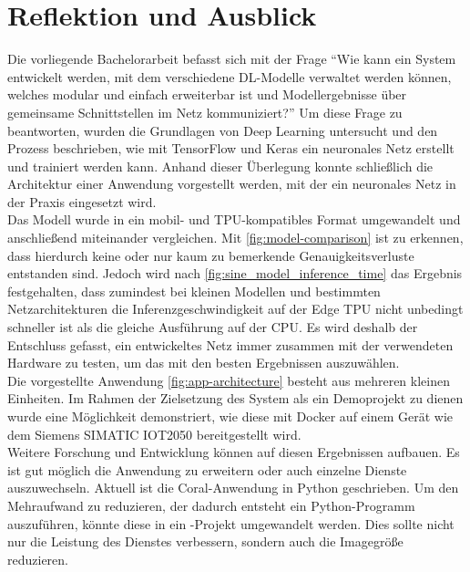 \chapter{Reflektion und Ausblick}
Die vorliegende Bachelorarbeit befasst sich mit der Frage
\enquote{Wie kann ein System entwickelt werden, mit dem verschiedene DL-Modelle
verwaltet werden können, welches modular und einfach erweiterbar ist
und Modellergebnisse über gemeinsame Schnittstellen im Netz kommuniziert?}
Um diese Frage zu beantworten, wurden
die Grundlagen von Deep Learning untersucht
und den Prozess beschrieben, wie mit TensorFlow und Keras
ein neuronales Netz erstellt und trainiert werden kann.
Anhand dieser Überlegung konnte schließlich die Architektur einer Anwendung
vorgestellt werden, mit der ein neuronales Netz in der Praxis eingesetzt wird.\\[8pt]
Das Modell wurde in ein mobil- und TPU-kompatibles Format umgewandelt
und anschließend miteinander vergleichen.
Mit \autoref{fig:model-comparison} ist zu erkennen,
dass hierdurch keine oder nur kaum zu bemerkende Genauigkeitsverluste
entstanden sind.
Jedoch wird nach \autoref{fig:sine_model_inference_time}
das Ergebnis festgehalten,
dass zumindest bei kleinen Modellen und bestimmten Netzarchitekturen
die Inferenzgeschwindigkeit
auf der Edge TPU nicht unbedingt schneller ist als die gleiche Ausführung auf der CPU.
Es wird deshalb der Entschluss gefasst,
ein entwickeltes Netz immer zusammen mit der verwendeten Hardware zu testen,
um das mit den besten Ergebnissen auszuwählen.\\[8pt]
Die vorgestellte Anwendung \eqref{fig:app-architecture} besteht aus mehreren kleinen
Einheiten. Im Rahmen der Zielsetzung des System als ein Demoprojekt zu dienen
wurde eine Möglichkeit demonstriert,
wie diese mit Docker auf einem Gerät wie dem Siemens
SIMATIC IOT2050 bereitgestellt wird.\\[8pt]
Weitere Forschung und Entwicklung können auf diesen Ergebnissen
aufbauen. Es ist gut möglich die Anwendung zu erweitern oder
auch einzelne Dienste auszuwechseln.
Aktuell ist die Coral-Anwendung in Python geschrieben.
Um den Mehraufwand zu reduzieren, der dadurch entsteht ein
Python-Programm auszuführen, könnte diese in ein \cpp{}-Projekt
umgewandelt werden.
Dies sollte nicht nur die Leistung des Dienstes verbessern, sondern
auch die Imagegröße reduzieren.